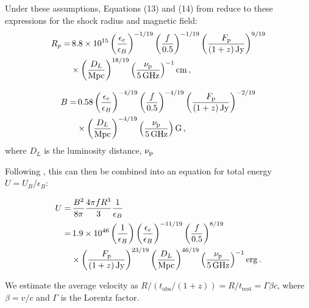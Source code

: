 \documentclass[twocolumn,twocolappendix, linenumbers, trackchanges]{aastex7}
\begin{document}
Under these assumptions, Equations (13) and (14) from \citet{chevalier} reduce to these expressions for the shock radius and magnetic field:
\begin{equation}
\begin{split}
    R_p =& \,8.8 \times 10^{15}
    \left( \frac{\epsilon_e}{\epsilon_B}\right)^{-1/19}
    \left( \frac{f}{0.5}\right)^{-1/19}
    \left( \frac{F_{\rm p}}{(1+z)\, \text{Jy}}\right)^{9/19} \\
    &\times
    \left( \frac{D_L}{\text{Mpc}}\right)^{18/19}
    \left( \frac{\nu_{\rm p}}{5 \,\text{GHz}}\right)^{-1} \mathrm{cm}\, ,
\end{split}
\end{equation}


\begin{equation}
\begin{split}
    B =& \,0.58
    \left( \frac{\epsilon_e}{\epsilon_B}\right)^{-4/19}
    \left( \frac{f}{0.5}\right)^{-4/19}
    \left( \frac{F_{\rm p}}{(1+z)\,\text{Jy}}\right)^{-2/19} \\
    &\times
    \left( \frac{D_L}{\text{Mpc}}\right)^{-4/19}
    \left( \frac{\nu_{\rm p}}{5 \,\text{GHz}}\right) \mathrm{G}\, ,
\end{split}
\end{equation}
where $D_L$ is the luminosity distance, $\nu_{\rm p}$ 

Following \citet{ho2019}, this can then be combined into an equation for total energy $U=U_B/\epsilon_B$:

\begin{equation}
\begin{split}
    U =& \, \frac{B^2}{8\pi}\frac{4 \pi f R^3}{3}\frac{1}{\epsilon_B}\\
    =& \,1.9\times10^{46} \left( \frac{1}{\epsilon_B} \right)
    \left( \frac{\epsilon_e}{\epsilon_B}\right)^{-11/19}
    \left( \frac{f}{0.5}\right)^{8/19}\\
    &\times
    \left( \frac{F_{\rm p}}{(1+z)\,\text{Jy}}\right)^{23/19} 
    \left( \frac{D_L}{\text{Mpc}}\right)^{46/19}
    \left( \frac{\nu_{\rm p}}{5 \,\text{GHz}}\right)^{-1} \mathrm{erg}\, .
\end{split}
\label{eq:energy}
\end{equation}

We estimate the average velocity as $R/( t_{\mathrm{obs}}/(1+z))=R/ t_{\mathrm{rest}}=\Gamma \beta c$, where $\beta=v/c$ and $\Gamma$ is the Lorentz factor.
\end{document}
